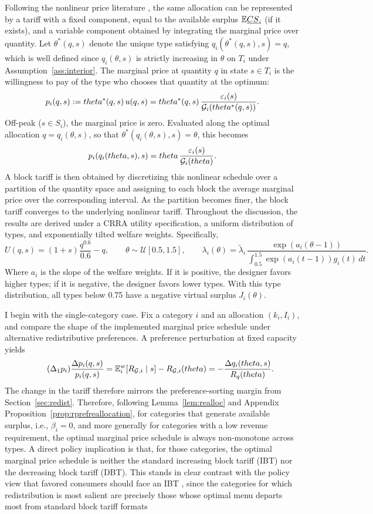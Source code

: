 \documentclass{class}
\begin{document}
Following the nonlinear price literature \citep{Spence1977,Maskin1984,spulber1992capacity}, the same allocation can be represented by a tariff with a fixed component, equal to the available surplus $\mathbb{E} \underline{CS}_i$ (if it exists), and a variable component obtained by integrating the marginal price over quantity. Let $\theta^\ast(q,s)$ denote the unique type satisfying $q_i(\theta^\ast(q,s),s)=q$, which is well defined since $q_i(\theta,s)$ is strictly increasing in $\theta$ on $T_i$ under Assumption~\ref{ass:interior}. The marginal price at quantity $q$ in state $s\in T_i$ is the willingness to pay of the type who chooses that quantity at the optimum:
\[p_i(q,s) := theta^\ast(q,s)\,u\!\left(q,s\right) = theta^\ast(q,s)\,\frac{\varepsilon_i(s)}{\mathcal{G}_i(theta^\ast(q,s))}.\]
Off-peak ($s\in S_i$), the marginal price is zero. Evaluated along the optimal allocation $q=q_i(\theta,s)$, so that $\theta^\ast(q_i(\theta,s),s)=\theta$, this becomes
\[p_i(q_i(theta,s),s) = theta\,\frac{\varepsilon_i(s)}{\mathcal{G}_i(theta)}.\]
A block tariff is then obtained by discretizing this nonlinear schedule over a partition of the quantity space and assigning to each block the average marginal price over the corresponding interval. As the partition becomes finer, the block tariff converges to the underlying nonlinear tariff. Throughout the discussion, the results are derived under a CRRA utility specification, a uniform distribution of types, and exponentially tilted welfare weights. Specifically,
\[
U(q,s)=(1+s)\frac{q^{0.6}}{0.6}-q,
\qquad
\theta\sim \mathcal U\left[0.5,1.5\right],
\qquad
\lambda_i(\theta)=\tilde{\lambda}_i\,
\frac{\exp\left(a_i(\theta-1)\right)}
{\int_{0.5}^{1.5}\exp\left(a_i(t-1)\right)g_i(t)\,dt }.
\]
Where $a_i$ is the slope of the welfare weights. If it is positive, the designer favors higher types; if it is negative, the designer favors lower types. With this type distribution, all types below  0.75 have a negative virtual surplus $J_i(\theta)$. 

I begin with the single-category case. Fix a category \(i\) and an allocation \((k_i,I_i)\), and compare the shape of the implemented marginal price schedule under alternative redistributive preferences. A preference perturbation at fixed capacity yields 
\[\label{Deltapi1}\tag{$\Delta_1 p_i$}
\frac{\Delta p_i(q,s)}{p_i(q,s)}=\mathbb{E}_i^{w}\!\left[R_{\mathcal{G},i}\mid s\right]-R_{\mathcal{G},i}(theta)=-\frac{\Delta q_i(theta,s)}{R_q(theta)}.
\] 
The change in the tariff therefore mirrors the preference-sorting margin from Section~\ref{sec:redist}. Therefore, following Lemma~\ref{lem:realloc} and Appendix Proposition~\ref{prop:rprefreallocation}, for categories that generate available surplus, i.e., $\beta_i=0$, and more generally for categories with a low revenue requirement, the optimal marginal price schedule is always non-monotone across types. A direct policy implication is that, for those categories, the optimal marginal price schedule is neither the standard increasing block tariff (IBT) nor the decreasing block tariff (DBT). This stands in clear contrast with the policy view that favored consumers should face an IBT \citep{Borenstein2012}, since the categories for which redistribution is most salient are precisely those whose optimal menu departs most from standard block tariff formats
\end{document}

